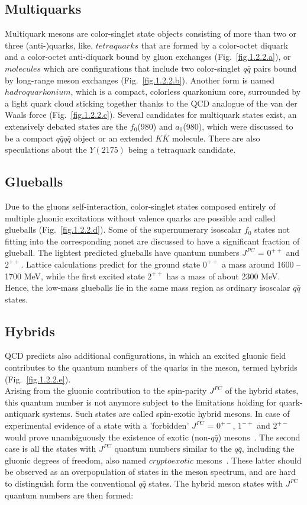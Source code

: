 \subsection{Multiquarks}
Multiquark mesons are color-singlet state objects consisting of more than two or three (anti-)quarks, like, $tetraquarks$ that are formed by a color-octet diquark and a color-octet anti-diquark bound by gluon exchanges (Fig.~\ref{fig.1.2.2.a}), or $molecules$ which are configurations that include two color-singlet $q\bar{q}$ pairs bound by long-range meson exchanges (Fig.~\ref{fig.1.2.2.b}). Another form is named $hadroquarkonium$, which is a compact, colorless quarkonium core, surrounded by a light quark cloud sticking together thanks to the QCD analogue of the van der Waals force (Fig.~\ref{fig.1.2.2.c}). Several candidates for multiquark states exist, an extensively debated states are the $f_0$(980) and $a_0$(980), which were discussed to be a compact $q\bar{q}$$q\bar{q}$ object or an extended $K\bar{K}$ molecule. There are also speculations about the $Y(2175)$ being a tetraquark candidate.

\subsection{Glueballs}
Due to the gluons self-interaction, color-singlet states composed entirely of multiple gluonic excitations without valence quarks are possible and called glueballs (Fig.~\ref{fig.1.2.2.d}). Some of the supernumerary isoscalar $f_0$ states not fitting into the corresponding nonet are discussed to have a significant fraction of glueball. The lightest predicted glueballs have quantum numbers $J^{PC}$ = $0^{++}$ and $2^{++}$. Lattice calculations predict for the ground state $0^{++}$ a mass around 1600 – 1700 MeV, while the first excited state $2^{++}$ has a mass of about 2300 MeV. Hence, the low-mass glueballs lie in the same mass region as ordinary isoscalar $q\bar{q}$ states.

\subsection{Hybrids}
QCD predicts also additional configurations, in which an excited gluonic field contributes to the quantum numbers of the quarks in the meson, termed hybrids (Fig.~\ref{fig.1.2.2.e}).\\
Arising from the gluonic contribution to the spin-parity $J^{PC}$ of the hybrid states, this quantum number is not anymore subject to the limitations holding for quark-antiquark systems. Such states are called spin-exotic hybrid mesons. In case of experimental evidence of a state with a 'forbidden' $J^{PC}$ = $0^{+-}$, $1^{-+}$ and $2^{+-}$ would prove unambiguously the existence of exotic (non-$q\bar{q}$) mesons~\cite{Isgur85}. The second case is all the states with $J^{PC}$ quantum numbers similar to the $q\bar{q}$, including the gluonic degrees of freedom, also named $cryptoexotic$ mesons~\cite{Meyer18}. These latter should be observed as an overpopulation of states in the meson spectrum, and are hard to distinguish form the conventional $q\bar{q}$ states. The hybrid meson states with $J^{PC}$ quantum numbers are then formed:

